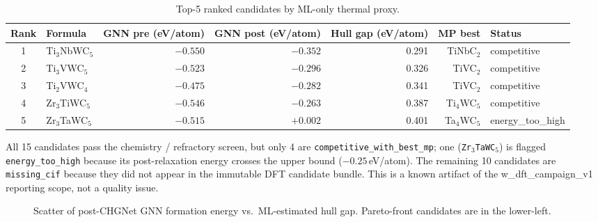 \documentclass[11pt,a4paper]{report}
\newcommand{\eV}{eV/atom}
\begin{document}
\begin{table}[h]
\centering
\caption{Top-5 ranked candidates by ML-only thermal proxy.}
\label{tab:top5}
\begin{tabular}{clrrrrl}
\toprule
\textbf{Rank} & \textbf{Formula} & \textbf{GNN pre (\eV)} & \textbf{GNN post (\eV)} & \textbf{Hull gap (\eV)} & \textbf{MP best} & \textbf{Status} \\
\midrule
1 & Ti$_3$NbWC$_5$  & $-0.550$ & $-0.352$ & 0.291 & TiNbC$_2$  & competitive \\
2 & Ti$_3$VWC$_5$   & $-0.523$ & $-0.296$ & 0.326 & TiVC$_2$   & competitive \\
3 & Ti$_2$VWC$_4$   & $-0.475$ & $-0.282$ & 0.341 & TiVC$_2$   & competitive \\
4 & Zr$_3$TiWC$_5$  & $-0.546$ & $-0.263$ & 0.387 & Ti$_4$WC$_5$ & competitive \\
5 & Zr$_3$TaWC$_5$  & $-0.515$ & $+0.002$ & 0.401 & Ta$_4$WC$_5$ & energy\_too\_high \\
\bottomrule
\end{tabular}
\end{table}

All 15 candidates pass the chemistry / refractory screen, but only 4 are
\texttt{competitive\_with\_best\_mp}; one (\texttt{Zr$_3$TaWC$_5$}) is flagged
\texttt{energy\_too\_high} because its post-relaxation energy crosses the upper bound
($-0.25$\,\eV{}). The remaining 10 candidates are \texttt{missing\_cif} because they did
not appear in the immutable DFT candidate bundle. This is a known artifact of the
w\_dft\_campaign\_v1 reporting scope, not a quality issue.

\begin{figure}[h]
\centering
{}
\caption{Scatter of post-CHGNet GNN formation energy vs.\ ML-estimated hull gap.
  Pareto-front candidates are in the lower-left.}
\label{fig:scatter}
\end{figure}
\end{document}
